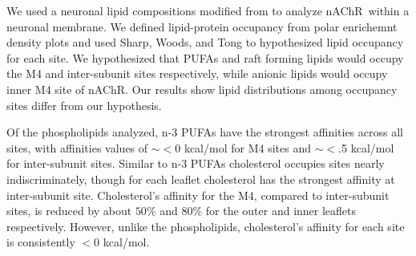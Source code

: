 \documentclass[preprint,3p,9pt,times,onecolumn]{elsarticle}
\newcommand{\nachr}{nAChR}
\newcommand{\plgic}{pLGIC}
\begin{document}
\label{con}

 
We used a neuronal lipid compositions modified from\cite{Ingolfsson2017b} to analyze \nachr~within a neuronal membrane. We defined lipid-protein occupancy from polar enrichemnt density plots and used Sharp\cite{Sharp2019}, Woods\cite{Woods2019}, and Tong\cite{Tong2019} to hypothesized lipid occupancy for each site. We hypothesized that PUFAs and raft forming lipids would occupy the M4 and inter-subunit sites respectively, while anionic lipids would occupy inner M4 site of \nachr. Our results show lipid distributions among occupancy sites differ from our hypothesis.

Of the phospholipids analyzed, n-3 PUFAs have the strongest affinities across all sites, with affinities values of $\sim<0$ kcal/mol for M4 sites and $\sim<$.5 kcal/mol for inter-subunit sites. %
Similar to n-3 PUFAs cholesterol occupies sites nearly indiscriminately, though for each leaflet cholesterol has the strongest affinity at inter-subunit site. Cholesterol's affinity for the M4, compared to inter-subunit sites, is reduced by about $50\%$ and $80\%$ for the outer and inner leaflets respectively. However, unlike the phospholipids, cholesterol's affinity for each site is consistently $<0$ kcal/mol. %

\end{document}
